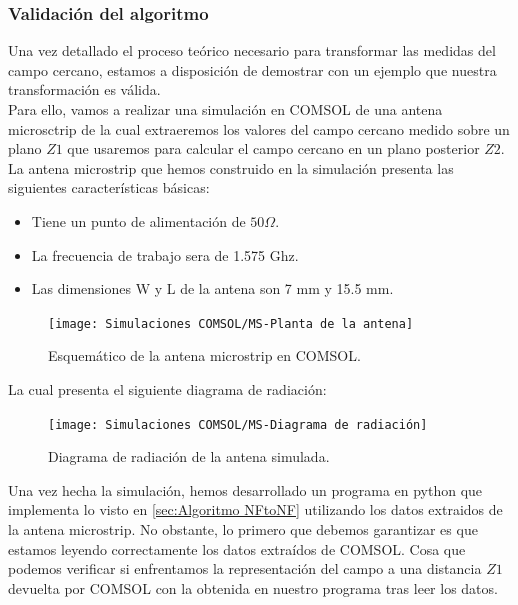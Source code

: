 \documentclass{article}
\begin{document}
\newpage
\subsubsection{Validación del algoritmo}

Una vez detallado el proceso teórico necesario para transformar las medidas del campo cercano, estamos a disposición de demostrar con un ejemplo que nuestra transformación es válida.\\
Para ello, vamos a realizar una simulación en COMSOL de una antena microsctrip  de la cual extraeremos los valores del campo cercano medido sobre un plano $Z1$ que usaremos para calcular el campo cercano en un plano posterior $Z2$.
\\

La antena microstrip que hemos construido en la simulación presenta las siguientes características básicas:

\begin{itemize}
    \item Tiene un punto de alimentación de $50\Omega$.
    \item La frecuencia de trabajo sera de 1.575 Ghz.
    \item Las dimensiones W y L de la antena son 7 mm y 15.5 mm.
\end{itemize}

\begin{figure}[h]
    \centering
    \texttt{[image: Simulaciones COMSOL/MS-Planta de la antena]}
    \caption{Esquemático de la antena microstrip en COMSOL.}
    \label{Simulaciones COMSOL/MS-Planta de la antena}
\end{figure}

La cual presenta el siguiente diagrama de radiación:
\begin{figure}[h]
  \centering
    \texttt{[image: Simulaciones COMSOL/MS-Diagrama de radiación]}
    \caption{Diagrama de radiación de la antena simulada.}
    \label{MS-Diagrama de radiación de la antena simulada}
\end{figure}

\newpage

Una vez hecha la simulación, hemos desarrollado un programa en python que implementa lo visto en \ref{sec:Algoritmo NFtoNF} utilizando los datos extraidos de la antena microstrip. No obstante, lo primero que debemos garantizar es que estamos leyendo correctamente los datos extraídos de COMSOL. Cosa que podemos verificar si enfrentamos la representación del campo a una distancia $Z1$ devuelta por COMSOL con la obtenida en nuestro programa tras leer los datos.\\
\end{document}
